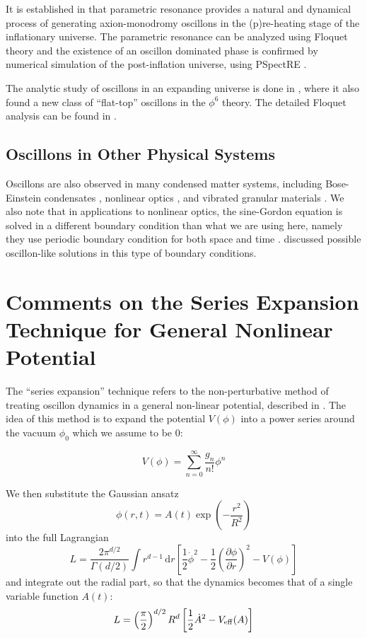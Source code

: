 \documentclass{report}
\begin{document}
It is established in \cite{Amin:2010dc, Amin:2011hj} that parametric resonance provides a natural and dynamical process of generating axion-monodromy oscillons in the (p)re-heating stage of the inflationary universe. The parametric resonance can be analyzed using Floquet theory and the existence of an oscillon dominated phase is confirmed by numerical simulation of the post-inflation universe, using PSpectRE \cite{Easther:2010qz}.

The analytic study of oscillons in an expanding universe is done in \cite{Amin:2010jq}, where it also found a new class of ``flat-top'' oscillons in the $\phi^6$ theory. The detailed Floquet analysis can be found in \cite{Amin:2010dc}.

\section{Oscillons in Other Physical Systems}
Oscillons are also observed in many condensed matter systems, including Bose-Einstein condensates \cite{umbanhowar1996localized}, nonlinear optics \cite{Copeland:2014qra}, and vibrated granular materials \cite{Tsimring:1997zz}. We also note that in applications to nonlinear optics, the sine-Gordon equation is solved in a different boundary condition than what we are using here, namely they use periodic boundary condition for both space and time \cite{JAWORSKI1982427, 0305-4470-15-10-015}. \cite{JAWORSKI1982427, 0305-4470-15-10-015} discussed possible oscillon-like solutions in this type of boundary conditions.

\chapter{Comments on the Series Expansion Technique for General Nonlinear Potential}\label{nonpertprob}
The ``series expansion'' technique refers to the non-perturbative method of treating oscillon dynamics in a general non-linear potential, described in \cite{PhysRevD.80.125037, Gleiser:2008ty}. The idea of this method is to expand the potential $V(\phi)$ into a power series around the vacuum $\phi_0$ which we assume to be $0$:

\begin{equation}
  V(\phi)=\sum_{n=0}^\infty \frac{g_n}{n!}\phi^n
\end{equation}

We then substitute the Gaussian ansatz
\begin{equation}
  \phi(r,t) = A(t) \exp\left(-\frac{r^2}{R^2}\right)
\end{equation}
into the full Lagrangian
\begin{equation}\label{lagfull}
    L = \frac{2\pi^{d/2}}{\Gamma(d/2)}\int r^{d-1}\,\mathrm{d}r\left[\frac{1}{2}\dot{\phi}^2 -
      \frac{1}{2}\left(\frac{\partial\phi}{\partial r}\right)^2-V(\phi)\right]
\end{equation}
and integrate out the radial part, so that the dynamics becomes that of a single variable function $A(t)$:
\begin{equation}
  L= \left(\frac{\pi}{2}\right)^{d/2}R^d\left[\frac{1}{2}\dot{A}^2 - V_{\rm eff}(A)\right]
\end{equation}
\end{document}
